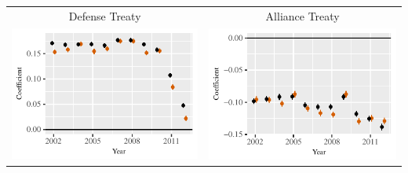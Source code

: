 \documentclass[reqno,onecolumn,letterpaper,12pt]{article}
\begin{document}
\begin{longtable}[!h]{c@{\hskip -.4cm}c}
\pagebreak
Defense Treaty &
Alliance Treaty\\
\includegraphics[height=.2\textheight, clip=true, trim=0cm .5cm 0cm .1cm]{draft_figures/rl_plots/Defense.pdf}   &
\includegraphics[height=.2\textheight, clip=true, trim=.5cm .5cm 0cm .1cm]{draft_figures/rl_plots/Alliance.pdf}\\

%
%


\end{longtable}
\end{document}
